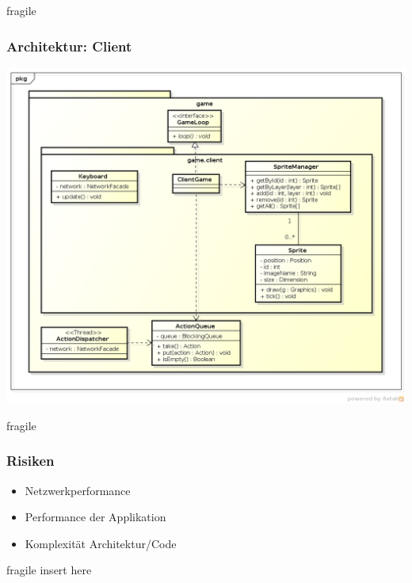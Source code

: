 \documentclass[10pt, compress]{beamer}
\begin{document}
\begin{frame}{fragile}
	\frametitle{Architektur: Client}
	\begin{center}
	\includegraphics[scale=0.3]{ClassDiagramGameClient}
	\end{center}
\end{frame}

\begin{frame}{fragile}
	\frametitle{Risiken}
	\begin{itemize}
	\item Netzwerkperformance
	\item Performance der Applikation
	\item Komplexität Architektur/Code
	\end{itemize}
\end{frame}


\begin{frame}{fragile}
    insert here
\end{frame}

\end{document}
